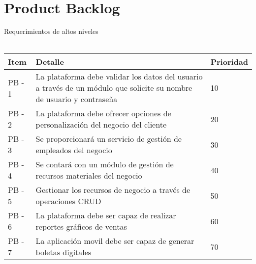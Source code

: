 \chapter{Product Backlog}
Requerimientos de altos niveles
\\\\

\begin{table}[htbp]
	\begin{center}
		\begin{tabular}{|p{1.2cm} | p{12cm} | p{2cm} |}
			\hline
			Item & Detalle & Prioridad \\
			\hline
			PB - 1 & La plataforma debe validar los datos del usuario a través de un módulo que solicite su nombre de usuario y contraseña & 10 \\
			\hline
			PB - 2 & La plataforma debe ofrecer opciones de personalización del negocio del cliente & 20  \\
			\hline
			PB - 3 & Se proporcionará un servicio de gestión de empleados del negocio & 30  \\
			\hline
			PB - 4 & Se contará con un módulo de gestión de recursos materiales del negocio & 40 \\
			\hline
			PB - 5 & Gestionar los recursos de negocio a través de operaciones CRUD & 50 \\
			\hline	
			PB - 6 & La plataforma debe ser capaz de realizar reportes gráficos de ventas & 60 \\
			\hline
			PB - 7 & La aplicación movil debe ser capaz de generar boletas digitales & 70 \\
			\hline
		\end{tabular}
	\end{center}
\end{table}
